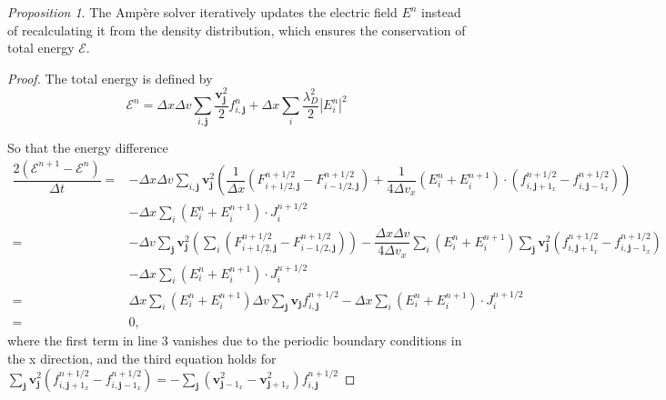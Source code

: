 \documentclass[preprint,1p,times]{elsarticle}
\theoremstyle{definition}
\theoremstyle{remark}
\newtheorem{proposition}{Proposition}
\begin{document}
\begin{proposition}
    The Amp\`ere solver iteratively updates the electric field $E^{n}$ instead of recalculating it from the density distribution, which ensures the conservation of total energy $\mathcal{E}$.
\end{proposition}
\begin{proof}
    The total energy is defined by
    \begin{equation}
        \mathcal{E}^{n} = \Delta x \Delta v \sum_{i,\bm{j}} \dfrac{\bm{v}_{\bm{j}}^{2}}{2} f_{i,\bm{j}}^{n} + \Delta x \sum_{i} \dfrac{\lambda_{D}^{2}}{2} |E_{i}^{n}|^{2}
    \end{equation}
    
    So that the energy difference
    \begin{equation}
    \begin{aligned}
        \dfrac{2(\mathcal{E}^{n+1}-\mathcal{E}^{n})}{\Delta t} =& - \Delta x \Delta v \sum_{i,\bm{j}} \bm{v}_{\bm{j}}^{2} 
        \left(\dfrac{1}{\Delta x} ( F_{i+1/2,\bm{j}}^{n+1/2} - F_{i-1/2,\bm{j}}^{n+1/2} ) + \dfrac{1}{4\Delta v_{x}} (E_{i}^{n}+E_{i}^{n+1}) \cdot (f_{i,\bm j+1_x}^{n+1/2} - f_{i,\bm j-1_x}^{n+1/2}) \right)\\
        & - \Delta x \sum_{i} (E_{i}^{n}+E_{i}^{n+1}) \cdot J_{i}^{n+1/2} \\
        =& - \Delta v \sum_{\bm{j}} \bm{v}_{\bm{j}}^{2} \left( \sum_{i} (F_{i+1/2,\bm{j}}^{n+1/2} - F_{i-1/2,\bm{j}}^{n+1/2}) \right) 
        - \dfrac{\Delta x \Delta v}{4 \Delta v_{x}} \sum_{i} (E_{i}^{n}+E_{i}^{n+1}) \sum_{\bm{j}} \bm{v}_{\bm{j}}^{2} (f_{i,\bm j+1_x}^{n+1/2} - f_{i,\bm j-1_x}^{n+1/2}) \\
        & - \Delta x \sum_{i} (E_{i}^{n}+E_{i}^{n+1}) \cdot J_{i}^{n+1/2} \\
        =& \Delta x \sum_{i} (E_{i}^{n}+E_{i}^{n+1}) \Delta v \sum_{\bm{j}} \bm{v}_{\bm{j}} f_{i,\bm j}^{n+1/2}
        - \Delta x \sum_{i} (E_{i}^{n}+E_{i}^{n+1}) \cdot J_{i}^{n+1/2} \\
        =& 0 ,
    \end{aligned}
    \end{equation}
    where the first term in line 3 vanishes due to the periodic boundary conditions in the x direction, and the third equation holds for $\sum_{\bm{j}} \bm{v}_{\bm{j}}^{2} (f_{i,\bm j+1_x}^{n+1/2} - f_{i,\bm j-1_x}^{n+1/2}) = - \sum_{\bm{j}} (\bm{v}_{\bm{j}-1_{x}}^{2} - \bm{v}_{\bm{j}+1_{x}}^{2}) f_{i,\bm j}^{n+1/2}$

\end{proof}
\end{document}
